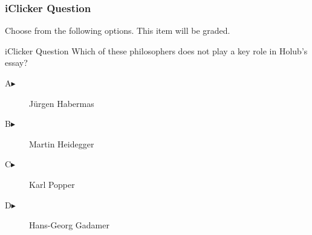 \documentclass[xcolor=dvipsnames]{beamer}
\begin{document}
\begin{frame}
  \frametitle{iClicker Question}
Choose from the following options. This item will be graded.
\begin{block}{iClicker Question}
Which of these philosophers does not play a key role in Holub's essay?
\end{block}
\begin{description}
\item[A\hspace{.2in}$\blacktriangleright$] J{\"u}rgen Habermas
\item[B\hspace{.2in}$\blacktriangleright$] Martin Heidegger
\item[C\hspace{.2in}$\blacktriangleright$] Karl Popper
\item[D\hspace{.2in}$\blacktriangleright$] Hans-Georg Gadamer
\end{description}
\end{frame}
\end{document}

